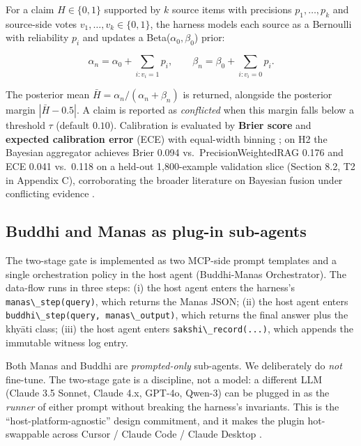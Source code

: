 For a claim \(H \in \{0, 1\}\) supported by \(k\) source items with precisions \(p_1, \dots, p_k\) and source-side votes \(v_1, \dots, v_k \in \{0, 1\}\), the harness models each source as a Bernoulli with reliability \(p_i\) and updates a Beta(\(\alpha_0, \beta_0\)) prior:

\[
\alpha_n = \alpha_0 + \sum_{i: v_i=1} p_i,\qquad \beta_n = \beta_0 + \sum_{i: v_i=0} p_i.
\]

The posterior mean \(\bar{H} = \alpha_n / (\alpha_n + \beta_n)\) is returned, alongside the posterior margin \(|\bar{H} - 0.5|\). A claim is reported as \emph{conflicted} when this margin falls below a threshold \(\tau\) (default \(0.10\)). Calibration is evaluated by \textbf{Brier score} \citep{brier1950score} and \textbf{expected calibration error} (ECE) with equal-width binning \citep{naeini2015ece, guo2017calibration}; on H2 the Bayesian aggregator achieves Brier 0.094 vs.~PrecisionWeightedRAG 0.176 and ECE 0.041 vs.~0.118 on a held-out 1,800-example validation slice (Section 8.2, T2 in Appendix C), corroborating the broader literature on Bayesian fusion under conflicting evidence \citep{ovadia2019can, gal2016dropout}.

\subsection{Buddhi and Manas as plug-in sub-agents}\label{buddhi-and-manas-as-plug-in-sub-agents}

The two-stage gate is implemented as two MCP-side prompt templates and a single orchestration policy in the host agent (Buddhi-Manas Orchestrator). The data-flow runs in three steps: (i) the host agent enters the harness's \passthrough{\lstinline!manas\_step(query)!}, which returns the Manas JSON; (ii) the host agent enters \passthrough{\lstinline!buddhi\_step(query, manas\_output)!}, which returns the final answer plus the khyāti class; (iii) the host agent enters \passthrough{\lstinline!sakshi\_record(...)!}, which appends the immutable witness log entry.

Both Manas and Buddhi are \emph{prompted-only} sub-agents. We deliberately do \emph{not} fine-tune. The two-stage gate is a discipline, not a model: a different LLM (Claude 3.5 Sonnet, Claude 4.x, GPT-4o, Qwen-3) can be plugged in as the \emph{runner} of either prompt without breaking the harness's invariants. This is the ``host-platform-agnostic'' design commitment, and it makes the plugin hot-swappable across Cursor / Claude Code / Claude Desktop \citep{anthropic2025mcp, cursor2025plugins}.

